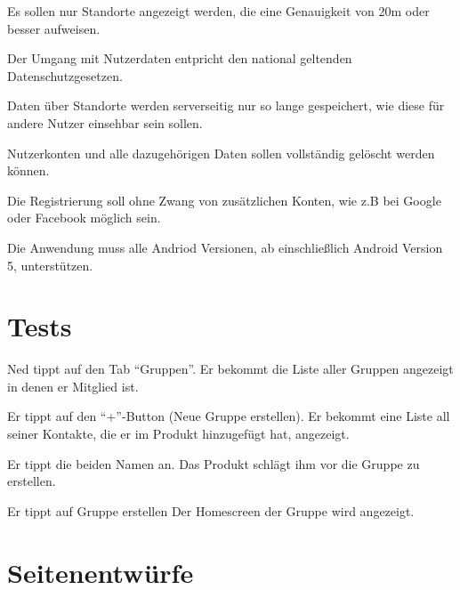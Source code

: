 \documentclass[parskip=full,11pt]{scrartcl}
\begin{document}
Es sollen nur Standorte angezeigt werden, die eine Genauigkeit von 20m oder besser aufweisen.

Der Umgang mit Nutzerdaten entpricht den national geltenden Datenschutzgesetzen.

Daten über Standorte werden serverseitig nur so lange gespeichert, wie diese für andere Nutzer einsehbar sein sollen.

Nutzerkonten und alle dazugehörigen Daten sollen vollständig gelöscht werden können.

Die Registrierung soll ohne Zwang von zusätzlichen Konten, wie z.B bei Google oder Facebook möglich sein.

Die Anwendung muss alle Andriod Versionen, ab einschließlich Android Version 5, unterstützen.



\section{Tests}


{Ned tippt auf den Tab  \enquote{Gruppen}.}
{Er bekommt die Liste aller Gruppen angezeigt in denen er Mitglied ist.}

{Er tippt auf den \enquote{+}-Button (Neue Gruppe erstellen).}
{Er bekommt eine Liste all seiner Kontakte, die er im Produkt hinzugefügt hat, angezeigt.}

{Er tippt die beiden Namen an.}
{Das Produkt schlägt ihm vor die Gruppe zu erstellen.}

{Er tippt auf Gruppe erstellen}
{Der Homescreen der Gruppe wird angezeigt.} %

\pagebreak
\appendix

\section{Seitenentwürfe}
\end{document}
